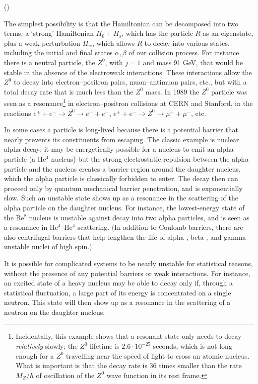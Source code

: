\begin{list}{()}{\setlength{\leftmargin}{2.3em}}
\item The simplest possibility is that the Hamiltonian can be decomposed into
two terms, a `strong' Hamiltonian $H_0+H_s$, which has the particle $R$ as an
eigenstate, plus a weak perturbation $H_w$, which allows $R$ to decay into
various states, including the initial and final states $\alpha,\beta$ of our
collision process. For instance there is a neutral particle, the $Z^0$, with
$j=1$ and mass 91 GeV, that would be stable in the absence of the electroweak
interactions. These interactions allow the $Z^0$ to decay into
electron--positron pairs, muon--antimuon pairs, etc., but with a total decay
rate that is much less than the $Z^0$ mass. In 1989 the $Z^0$ particle was
seen as a resonance\footnote{Incidentally, this example shows that a resonant
state only needs to decay \emph{relatively} slowly; the $Z^0$ lifetime is
$2.6\cdot10^{-25}$ seconds, which is not long enough for a $Z^0$ travelling
near the speed of light to cross an atomic nucleus. What is important is that
the decay rate is 36 times smaller than the rate $M_Z/\hbar$ of oscillation of
the $Z^0$ wave function in its rest frame.} in electron--positron collisions
at CERN and Stanford, in the reactions
$e^++e^-\to Z^0\to e^++e^-$,
$e^++e^-\to Z^0\to\mu^++\mu^-$, etc.

\item In some cases a particle is long-lived because there is a potential
barrier that nearly prevents its constituents from escaping. The classic
example is nuclear alpha decay: it may be energetically possible for a
nucleus to emit an alpha particle (a He$^4$ nucleus) but the strong
electrostatic repulsion between the alpha particle and the nucleus creates a
barrier region around the daughter nucleus, which the alpha particle is
classically forbidden to enter. The decay then can proceed only by quantum
mechanical barrier penetration, and is exponentially slow. Such an unstable
state shows up as a resonance in the scattering of the alpha particle on the
daughter nucleus. For instance, the lowest-energy state of the Be$^8$ nucleus
is unstable against decay into two alpha particles, and is seen as a
resonance in He$^4$--He$^4$ scattering. (In addition to Coulomb barriers,
there are also centrifugal barriers that help lengthen the life of alpha-,
beta-, and gamma-unstable nuclei of high spin.)

\item It is possible for complicated systems to be nearly unstable for
statistical reasons, without the presence of any potential barriers or weak
interactions. For instance, an excited state of a heavy nucleus may be able to
decay only if, through a statistical fluctuation, a large part of its energy
is concentrated on a single neutron. This state will then show up as a
resonance in the scattering of a neutron on the daughter nucleus.
\end{list}

